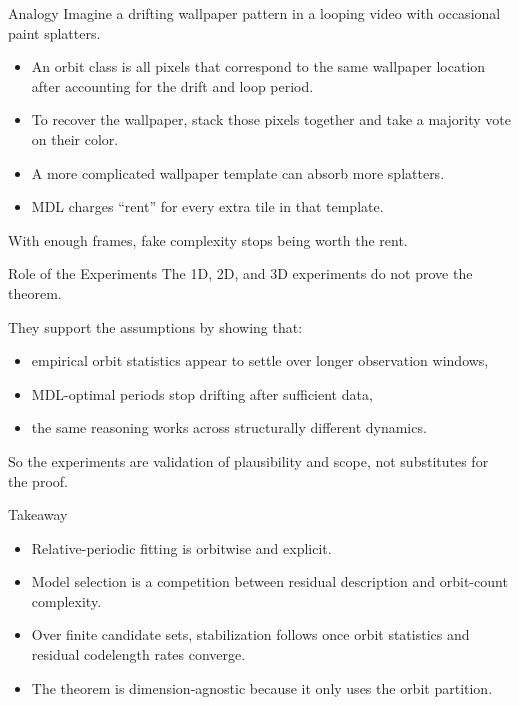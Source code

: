 \documentclass[aspectratio=169]{beamer}
\begin{document}
\begin{frame}{Analogy}
  Imagine a drifting wallpaper pattern in a looping video with occasional paint splatters.

  \begin{itemize}
    \item An orbit class is all pixels that correspond to the same wallpaper location after accounting for the drift and loop period.
    \item To recover the wallpaper, stack those pixels together and take a majority vote on their color.
    \item A more complicated wallpaper template can absorb more splatters.
    \item MDL charges ``rent'' for every extra tile in that template.
  \end{itemize}

  With enough frames, fake complexity stops being worth the rent.
\end{frame}

\begin{frame}{Role of the Experiments}
  The 1D, 2D, and 3D experiments do not prove the theorem.

  They support the assumptions by showing that:
  \begin{itemize}
    \item empirical orbit statistics appear to settle over longer observation windows,
    \item MDL-optimal periods stop drifting after sufficient data,
    \item the same reasoning works across structurally different dynamics.
  \end{itemize}

  So the experiments are validation of plausibility and scope, not substitutes for the proof.
\end{frame}

\begin{frame}{Takeaway}
  \begin{itemize}
    \item Relative-periodic fitting is orbitwise and explicit.
    \item Model selection is a competition between residual description and orbit-count complexity.
    \item Over finite candidate sets, stabilization follows once orbit statistics and residual codelength rates converge.
    \item The theorem is dimension-agnostic because it only uses the orbit partition.
  \end{itemize}
\end{frame}
\end{document}
